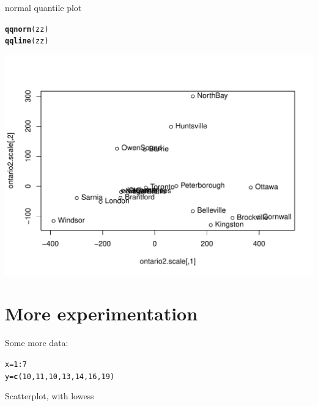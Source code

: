 \documentclass{article}\usepackage[]{graphicx}\usepackage[]{color}
\makeatletter
\def\maxwidth{ %
  \ifdim\Gin@nat@width>\linewidth
    \linewidth
  \else
    \Gin@nat@width
  \fi
}
\newcommand{\hlnum}[1]{\textcolor[rgb]{0.686,0.059,0.569}{#1}}%
\newcommand{\hlopt}[1]{\textcolor[rgb]{0,0,0}{#1}}%
\newcommand{\hlstd}[1]{\textcolor[rgb]{0.345,0.345,0.345}{#1}}%
\newcommand{\hlkwb}[1]{\textcolor[rgb]{0.69,0.353,0.396}{#1}}%
\newcommand{\hlkwd}[1]{\textcolor[rgb]{0.737,0.353,0.396}{\textbf{#1}}}%
\newenvironment{kframe}{%
 \def\at@end@of@kframe{}%
 \ifinner\ifhmode%
  \def\at@end@of@kframe{\end{minipage}}%
  \begin{minipage}{\columnwidth}%
 \fi\fi%
 \def\FrameCommand##1{\hskip\@totalleftmargin \hskip-\fboxsep
 \colorbox{shadecolor}{##1}\hskip-\fboxsep
     \hskip-\linewidth \hskip-\@totalleftmargin \hskip\columnwidth}%
 \MakeFramed {\advance\hsize-\width
   \@totalleftmargin\z@ \linewidth\hsize
   \@setminipage}}%
 {\par\unskip\endMakeFramed%
 \at@end@of@kframe}
\newenvironment{knitrout}{}{} %
\makeatother
\begin{document}
normal quantile plot

\begin{knitrout}
\color{fgcolor}\begin{kframe}
\begin{alltt}
\hlkwd{qqnorm}\hlstd{(zz)}
\hlkwd{qqline}\hlstd{(zz)}
\end{alltt}
\end{kframe}
\includegraphics[width=\maxwidth]{figure/unnamed-chunk-3} 

\end{knitrout}


\section{More experimentation}

Some more data:

\begin{knitrout}
\color{fgcolor}\begin{kframe}
\begin{alltt}
\hlstd{x} \hlkwb{=} \hlnum{1}\hlopt{:}\hlnum{7}
\hlstd{y} \hlkwb{=} \hlkwd{c}\hlstd{(}\hlnum{10}\hlstd{,} \hlnum{11}\hlstd{,} \hlnum{10}\hlstd{,} \hlnum{13}\hlstd{,} \hlnum{14}\hlstd{,} \hlnum{16}\hlstd{,} \hlnum{19}\hlstd{)}
\end{alltt}
\end{kframe}
\end{knitrout}


Scatterplot, with lowess
\end{document}
